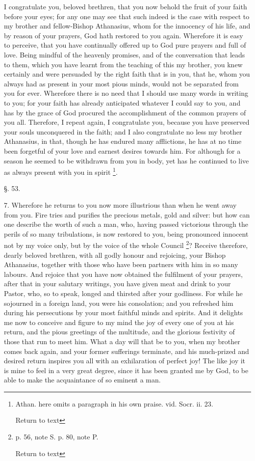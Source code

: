 I congratulate you, beloved brethren, that you
now behold the fruit of your faith before your eyes; for any one may
see that such indeed is the case with respect to my brother and
fellow-Bishop Athanasius, whom for the innocency of his life, and by
reason of your prayers, God hath restored to you again. Wherefore it
is easy to perceive, that you have continually offered up to God pure
prayers and full of love. Being mindful of the heavenly promises, and
of the conversation that leads to them, which you have learnt from the
teaching of this my brother, you knew certainly and were persuaded by
the right faith that is in you, that he, whom you always had as
present in your most pious minds, would not be separated from you for
ever. Wherefore there is no need that I should use many words in
writing to you; for your faith has already anticipated whatever I
could say to you, and has by the grace of God procured the
accomplishment of the common prayers of you all. Therefore, I repeat
again, I congratulate you, because you have preserved your souls
unconquered in the faith; and I also congratulate no less my brother
Athanasius, in that, though he has endured many afflictions, he has at
no time been forgetful of your love and earnest desires towards him.
For although for a season he seemed to be withdrawn from you in body,
yet has he continued to live as always present with you in spirit \footnote{Athan. here omits a paragraph in his own praise. vid. Socr. ii. 23.

Return to text}.

§. 53.

7. Wherefore he returns to you now more
illustrious than when he went away from you. Fire tries and purifies
the precious metals, gold and silver: but how can one describe the
worth of such a man, who, having passed victorious through the perils
of so many tribulations, is now restored to you, being pronounced
innocent not by my voice only, but by the voice of the whole Council \footnote{p. 56, note S. p. 80, note P.

Return to text}? Receive therefore, dearly beloved brethren, with all godly
honour and rejoicing, your Bishop Athanasius, together with those who
have been partners with him in so many labours. And rejoice that you
have now obtained the fulfilment of your prayers, after that in your
salutary writings, you have given meat and drink to your Pastor, who,
so to speak, longed and thirsted after your godliness. For while
he sojourned in a foreign land, you were his consolation; and you
refreshed him during his persecutions by your most faithful minds and
spirits. And it delights me now to conceive and figure to my mind the
joy of every one of you at his return, and the pious greetings of the
multitude, and the glorious festivity of those that run to meet him.
What a day will that be to you, when my brother comes back again, and
your former sufferings terminate, and his much-prized and desired
return inspires you all with an exhilaration of perfect joy! The like
joy it is mine to feel in a very great degree, since it has been
granted me by God, to be able to make the acquaintance of so eminent a
man.

